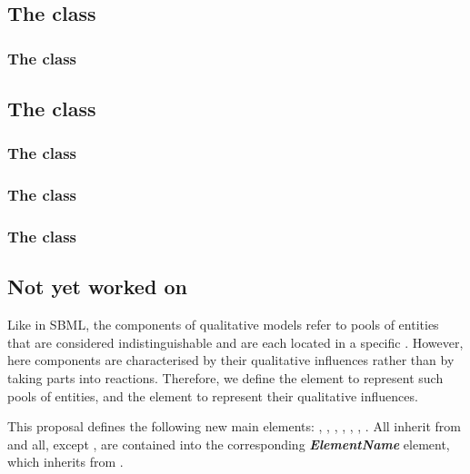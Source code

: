 \subsection{The  class}
\label{qualSpecies-class}

\subsubsection{The  class}

\subsection{The  class}
\label{transitions-class}

\subsubsection{The  class}

\subsubsection{The  class}

\subsubsection{The  class}


\subsection{Not yet worked on}
Like  in SBML, the components of qualitative models refer to pools of entities that are considered indistinguishable and are each located in a specific . However, here components are characterised by their qualitative influences rather than by taking parts into reactions. Therefore, we define the  element to represent such pools of entities, and the  element to represent their qualitative influences.

This proposal defines the following new main elements: , , , , , , . All inherit from  and all, except , are contained into the corresponding \textbf{\emph{ElementName}} element, which inherits from .%

